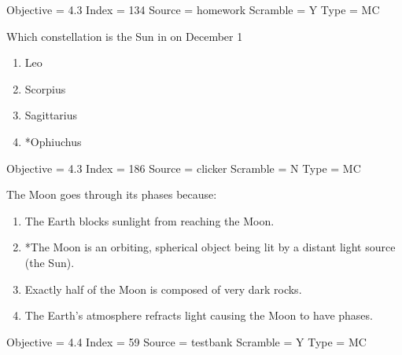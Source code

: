 \documentclass[11pt]{article}
\begin{document}
\begin{enumerate}
\begin{minipage}{\textwidth}
\begin{minipage}{\textwidth}
Objective = 4.3
Index = 134
Source = homework
Scramble = Y
Type = MC
\end{minipage}
\end{minipage}
\vskip 0.20in

\begin{minipage}{\textwidth}
\begin{minipage}{\textwidth}
\item Which constellation is the Sun in on December 1
\begin{multicols}{3}
\begin{enumerate} 
\setlength{\itemsep}{1pt} 
\setlength{\parskip}{0pt} 
\setlength{\parsep}{0pt}
\setlength{\multicolsep}{1pt} 
\item Leo
\item Scorpius
\item Sagittarius
\item *Ophiuchus
\end{enumerate} 
\vfill 
\end{multicols}

Objective = 4.3
Index = 186
Source = clicker
Scramble = N
Type = MC
\end{minipage}
\end{minipage}
\vskip 0.20in

\begin{minipage}{\textwidth}
\begin{minipage}{\textwidth}
\item The Moon goes through its phases because:
\begin{enumerate} 
\setlength{\itemsep}{1pt} 
\setlength{\parskip}{0pt} 
\setlength{\parsep}{0pt}
\setlength{\multicolsep}{1pt} 
\item The Earth blocks sunlight from reaching the Moon.
\item *The Moon is an orbiting, spherical object being lit by a distant light source (the Sun).
\item Exactly half of the Moon is composed of very dark rocks.
\item The Earth's atmosphere refracts light causing the Moon to have phases.
\end{enumerate} 
Objective = 4.4
Index = 59
Source = testbank
Scramble = Y
Type = MC
\end{minipage}
\end{minipage}
\vskip 0.20in


\end{enumerate}
\end{document}
